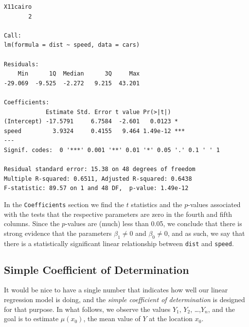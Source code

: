 \documentclass[captions=tableheading]{scrbook}
\begin{document}
\begin{verbatim}
X11cairo 
       2
 
Call:
lm(formula = dist ~ speed, data = cars)

Residuals:
    Min      1Q  Median      3Q     Max 
-29.069  -9.525  -2.272   9.215  43.201 

Coefficients:
            Estimate Std. Error t value Pr(>|t|)    
(Intercept) -17.5791     6.7584  -2.601   0.0123 *  
speed         3.9324     0.4155   9.464 1.49e-12 ***
---
Signif. codes:  0 '***' 0.001 '**' 0.01 '*' 0.05 '.' 0.1 ' ' 1 

Residual standard error: 15.38 on 48 degrees of freedom
Multiple R-squared: 0.6511,	Adjusted R-squared: 0.6438 
F-statistic: 89.57 on 1 and 48 DF,  p-value: 1.49e-12
\end{verbatim}

In the \texttt{Coefficients} section we find the \(t\) statistics and the \(p\)-values associated with the tests that the respective parameters are zero in the fourth and fifth columns. Since the \(p\)-values are (much) less than 0.05, we conclude that there is strong evidence that the parameters \(\beta_{1}\neq0\) and \(\beta_{0}\neq0\), and as such, we say that there is a statistically significant linear relationship between \texttt{dist} and \texttt{speed}. 
\subsection{Simple Coefficient of Determination}
\label{sec-11-3-2}


It would be nice to have a single number that indicates how well our linear regression model is doing, and the \emph{simple coefficient of determination} is designed for that purpose. In what follows, we observe the values \(Y_{1}\), \(Y_{2}\), \ldots{},\(Y_{n}\), and the goal is to estimate \(\mu(x_{0})\), the mean value of \(Y\) at the location \(x_{0}\). 
\end{document}
